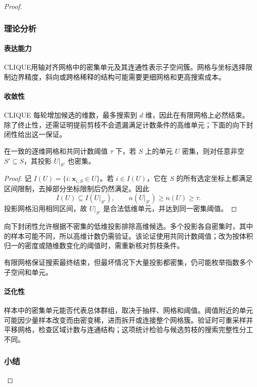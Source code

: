 \begin{proof}
\subsubsection{理论分析}

\paragraph{表达能力}
CLIQUE用轴对齐网格中的密集单元及其连通性表示子空间簇。网格与坐标选择限制边界精度，斜向或跨格稀释的结构可能需要更细网格和更高搜索成本。

\paragraph{收敛性}
CLIQUE 每轮增加候选的维数，最多搜索到 $d$ 维，因此在有限网格上必然结束。除了终止性，还需证明提前剪枝不会遗漏满足计数条件的高维单元；下面的向下封闭性给出这一保证。

\begin{theorem}[子空间密集性的向下封闭性]
 \label{thm:clustering-clique}
 在一致的逐维网格和共同计数阈值 $\tau$ 下，若 $S$ 上的单元 $U$ 密集，则对任意非空 $S'\subseteq S$，其投影 $U|_{S'}$ 也密集。
\end{theorem}
\begin{proof}
记 $I(U)=\{i:\bm{x}_{i,S}\in U\}$。若 $i\in I(U)$，它在 $S$ 的所有选定坐标上都满足区间限制，去掉部分坐标限制后仍然满足。因此
\[
 I(U)\subseteq I(U|_{S'}),\qquad
 n(U|_{S'})\geq n(U)\geq\tau.
\]
投影网格沿用相同区间，故 $U|_{S'}$ 是合法低维单元，并达到同一密集阈值。
\end{proof}

向下封闭性允许根据不密集的低维投影排除高维候选。多个投影各自密集时，其中的样本可能不同，所以高维计数仍需验证。该论证使用共同计数阈值；改为按体积归一的密度或随维数变化的阈值时，需重新核对剪枝条件。

有限网格保证搜索最终结束，但最坏情况下大量投影都密集，仍可能枚举指数多个子空间和单元。

\paragraph{泛化性}
样本中的密集单元能否代表总体群组，取决于抽样、网格和阈值。阈值附近的单元可能因少量样本改变而由密变稀，进而拆开或连接整个网格簇。验证时可重采样并平移网格，检查区域计数与连通结构；这项统计检验与候选剪枝的搜索完整性分工不同。

\subsubsection{小结}


\end{proof}
